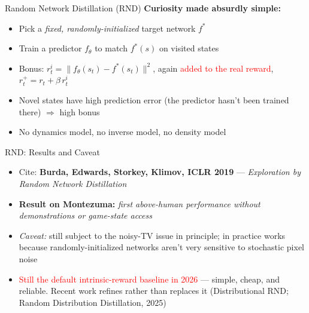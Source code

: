 \begin{frame}{Random Network Distillation (RND)}
\textbf{Curiosity made absurdly simple:}
\begin{itemize}
    \setlength{\itemsep}{0.55em}
    \item Pick a \emph{fixed, randomly-initialized} target network $f^*$
    \item Train a predictor $f_\theta$ to match $f^*(s)$ on visited states
    \item Bonus: $r_t^i = \|f_\theta(s_t) - f^*(s_t)\|^2$, again \textcolor{red}{added to the real reward}, $r_t^+ = r_t + \beta\, r_t^i$
\end{itemize}
\vspace{0.6em}
\begin{itemize}
    \item Novel states have high prediction error (the predictor hasn't been trained there) $\Rightarrow$ high bonus
    \item No dynamics model, no inverse model, no density model
\end{itemize}
\end{frame}

\begin{frame}{RND: Results and Caveat}
\begin{itemize}
    \setlength{\itemsep}{0.55em}
    \item Cite: \textbf{Burda, Edwards, Storkey, Klimov, ICLR 2019} --- \emph{Exploration by Random Network Distillation}
    \item \textbf{Result on Montezuma:} \emph{first above-human performance without demonstrations or game-state access}
    \item \emph{Caveat:} still subject to the noisy-TV issue in principle; in practice works because randomly-initialized networks aren't very sensitive to stochastic pixel noise
    \item \textcolor{red}{Still the default intrinsic-reward baseline in 2026} --- simple, cheap, and reliable. Recent work refines rather than replaces it (Distributional RND; Random Distribution Distillation, 2025)
\end{itemize}
\end{frame}

